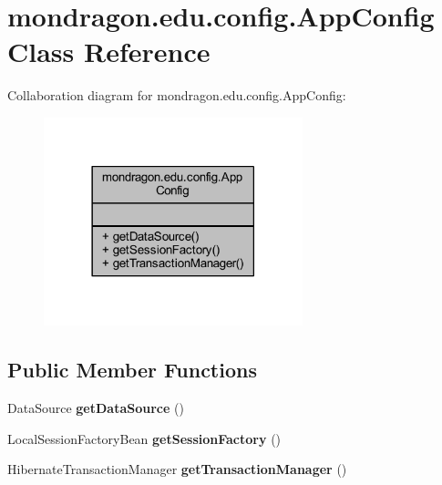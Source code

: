 \hypertarget{classmondragon_1_1edu_1_1config_1_1_app_config}{}\section{mondragon.\+edu.\+config.\+App\+Config Class Reference}
\label{classmondragon_1_1edu_1_1config_1_1_app_config}


Collaboration diagram for mondragon.\+edu.\+config.\+App\+Config\+:\nopagebreak
\begin{figure}[H]
\begin{center}
\leavevmode
\includegraphics[width=213pt]{classmondragon_1_1edu_1_1config_1_1_app_config__coll__graph}
\end{center}
\end{figure}
\subsection*{Public Member Functions}
\begin{DoxyCompactItemize}
\item 
\mbox{\label{classmondragon_1_1edu_1_1config_1_1_app_config_a4d4eb2f9a7683768586f5f0fbac20ba5}} 
Data\+Source {\bfseries get\+Data\+Source} ()
\item 
\mbox{\label{classmondragon_1_1edu_1_1config_1_1_app_config_af80972addb232df276681d9fdf3084ef}} 
Local\+Session\+Factory\+Bean {\bfseries get\+Session\+Factory} ()
\item 
\mbox{\label{classmondragon_1_1edu_1_1config_1_1_app_config_a0de3d5a60dcba84c2b19b9eececd03e1}} 
Hibernate\+Transaction\+Manager {\bfseries get\+Transaction\+Manager} ()
\end{DoxyCompactItemize}


